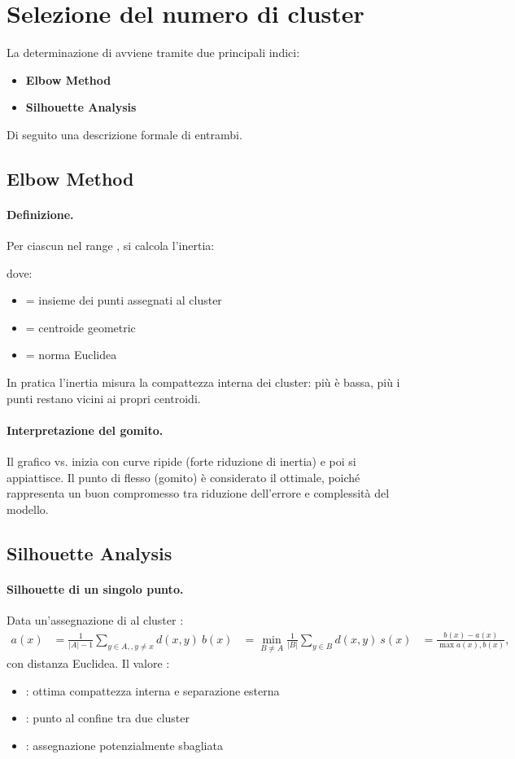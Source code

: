\documentclass[a4paper,12pt]{article}
\begin{document}
\section{Selezione del numero di cluster}
La determinazione di  avviene tramite due principali indici:
\begin{itemize}
\item \textbf{Elbow Method}
\item \textbf{Silhouette Analysis}
\end{itemize}
Di seguito una descrizione formale di entrambi.

\subsection{Elbow Method}
\paragraph{Definizione.} Per ciascun  nel range , si calcola l'inertia:



dove:
\begin{itemize}
\item  = insieme dei punti assegnati al cluster 
\item  = centroide geometric
\item  = norma Euclidea
\end{itemize}
In pratica l'inertia misura la compattezza interna dei cluster: più è bassa, più i punti restano vicini ai propri centroidi.

\paragraph{Interpretazione del gomito.} Il grafico  vs.  inizia con curve ripide (forte riduzione di inertia) e poi si appiattisce. Il punto di flesso (gomito) è considerato il  ottimale, poiché rappresenta un buon compromesso tra riduzione dell'errore e complessità del modello.

\subsection{Silhouette Analysis}
\paragraph{Silhouette di un singolo punto.} Data un'assegnazione di  al cluster :
\begin{align*}
a(x) &= \frac{1}{|A|-1} \sum_{y \in A,, y\neq x} d(x,y)  \
b(x) &= \min_{B \neq A} \frac{1}{|B|} \sum_{y \in B} d(x,y) \
s(x) &= \frac{b(x) - a(x)}{\max{a(x), b(x)}},
\end{align*}
con  distanza Euclidea. Il valore :
\begin{itemize}
\item : ottima compattezza interna e separazione esterna
\item : punto al confine tra due cluster
\item : assegnazione potenzialmente sbagliata
\end{itemize}
\end{document}
